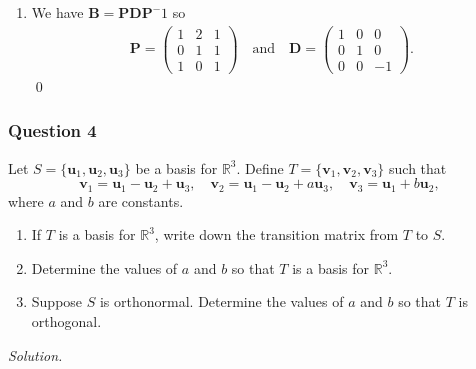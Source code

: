 \documentclass[12pt]{article}
\begin{document}
\begin{enumerate}[label=\textbf{(\alph*)}]
\[\begin{pmatrix}
    \end{pmatrix}\right\}.\]
    \item We have $\mathbf{B}=\mathbf{PDP}^-1$ so \begin{align*}
        \mathbf{P}=\begin{pmatrix}
            1&2&1\\0&1&1\\1&0&1
        \end{pmatrix}\quad\text{and}\quad \mathbf{D}=\begin{pmatrix}
            1&0&0\\0&1&0\\0&0&-1
        \end{pmatrix}.
    \end{align*}\qed 
\end{enumerate}
\newpage
\subsubsection*{Question 4}
Let \(S = \{\mathbf{u}_1,\mathbf{u}_2,\mathbf{u}_3\}\) be a basis for \(\mathbb{R}^3\). Define \(T = \{\mathbf{v}_1,\mathbf{v}_2,\mathbf{v}_3\}\) such that
\[
\mathbf{v}_1 = \mathbf{u}_1 - \mathbf{u}_2 + \mathbf{u}_3, \quad \mathbf{v}_2 = \mathbf{u}_1 - \mathbf{u}_2 + a \mathbf{u}_3, \quad \mathbf{v}_3 = \mathbf{u}_1 + b \mathbf{u}_2,
\]
where \(a\) and \(b\) are constants.
\begin{enumerate}[label=\textbf{(\alph*)}]
\itemsep 0em
    \item If \(T\) is a basis for \(\mathbb{R}^3\), write down the transition matrix from \(T\) to \(S\).
    \item Determine the values of \(a\) and \(b\) so that \(T\) is a basis for \(\mathbb{R}^3\).
    \item Suppose \(S\) is orthonormal. Determine the values of \(a\) and \(b\) so that \(T\) is orthogonal.
\end{enumerate}
\noindent\emph{Solution.}
\end{document}
